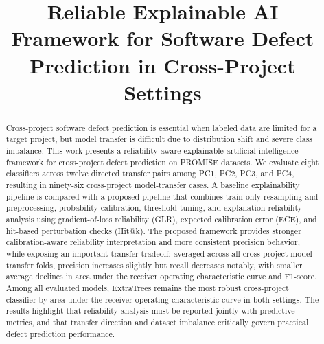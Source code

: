 \documentclass[conference]{IEEEtran}
\begin{document}
\title{Reliable Explainable AI Framework for Software Defect Prediction in Cross-Project Settings}

\author{
\and
{}
}

\maketitle

\begin{abstract}
Cross-project software defect prediction is essential when labeled data are limited for a target project, but model transfer is difficult due to distribution shift and severe class imbalance. This work presents a reliability-aware explainable artificial intelligence framework for cross-project defect prediction on PROMISE datasets. We evaluate eight classifiers across twelve directed transfer pairs among PC1, PC2, PC3, and PC4, resulting in ninety-six cross-project model-transfer cases. A baseline explainability pipeline is compared with a proposed pipeline that combines train-only resampling and preprocessing, probability calibration, threshold tuning, and explanation reliability analysis using gradient-of-loss reliability (GLR), expected calibration error (ECE), and hit-based perturbation checks (Hit@k). The proposed framework provides stronger calibration-aware reliability interpretation and more consistent precision behavior, while exposing an important transfer tradeoff: averaged across all cross-project model-transfer folds, precision increases slightly but recall decreases notably, with smaller average declines in area under the receiver operating characteristic curve and F1-score. Among all evaluated models, ExtraTrees remains the most robust cross-project classifier by area under the receiver operating characteristic curve in both settings. The results highlight that reliability analysis must be reported jointly with predictive metrics, and that transfer direction and dataset imbalance critically govern practical defect prediction performance.
\end{abstract}
\end{document}

